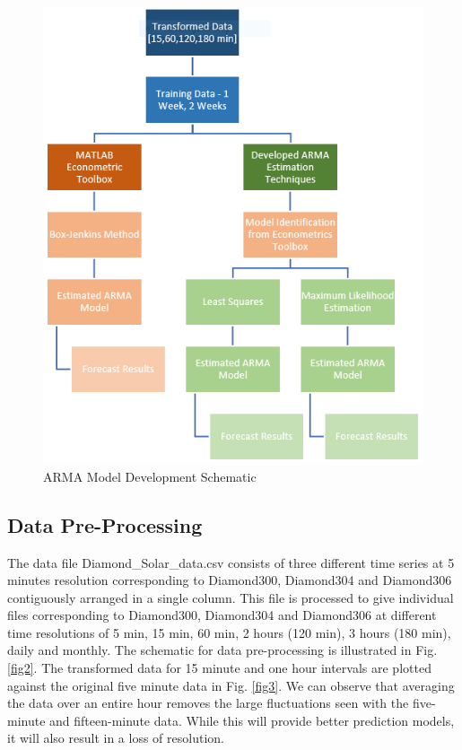 \documentclass[journal]{IEEEtran}
\begin{document}
\begin{figure}[htpb]
\centering
\includegraphics[scale=0.4]{ObjectivesSchematic.png}
\caption{ARMA Model Development Schematic}
\label{fig1} %
\end{figure}

\subsection{Data Pre-Processing}



The data file Diamond\_Solar\_data.csv consists of three different time series at 5 minutes resolution corresponding to Diamond300, Diamond304 and Diamond306 contiguously arranged in a single column. This file is processed to give individual files corresponding to Diamond300, Diamond304 and Diamond306 at different time resolutions of 5 min, 15 min, 60 min, 2 hours (120 min), 3 hours (180 min), daily and monthly. The schematic for data pre-processing is illustrated in Fig. \ref{fig2}. The transformed data for 15 minute and one hour intervals are plotted against the original five minute data in Fig. \ref{fig3}. We can observe that averaging the data over an entire hour removes the large fluctuations seen with the five-minute and fifteen-minute data. While this will provide better prediction models, it will also result in a loss of resolution.
\end{document}
